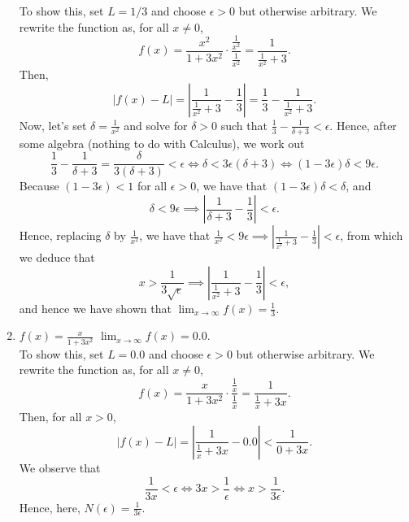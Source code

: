 \begin{enumerate}
    To show this, set $L=1/3$ and choose $\epsilon >0$ but otherwise arbitrary. We rewrite the function as, for all $x \neq 0$,
    $$f(x) = \frac{x^2}{1 + 3 x^2} \cdot \frac{\frac{1}{x^2}}{\frac{1}{x^2}} =  \frac{1}{\frac{1}{x^2} + 3 }.$$
     Then, 
   $$ |f(x) -L| = |\frac{1}{\frac{1}{x^2} + 3 } - \frac{1}{3}|  =  \frac{1}{3} - \frac{1}{\frac{1}{x^2} + 3 }.$$ 
   Now, let's set $\delta =  \frac{1}{x^2}$ and solve for $\delta>0$ such that $\frac{1}{3} - \frac{1}{\delta + 3 } < \epsilon.$ Hence, after some algebra (nothing to do with Calculus), we work out
   $$\frac{1}{3} - \frac{1}{\delta + 3 } = \frac{\delta}{3 (\delta + 3)} < \epsilon \iff \delta < 3 \epsilon (\delta + 3) \iff (1-3 \epsilon) \delta < 9 \epsilon .$$
   Because $(1-3 \epsilon) < 1$ for all $\epsilon>0$, we have that  $(1-3 \epsilon) \delta < \delta$, and 
   $$\delta < 9 \epsilon \implies   |\frac{1}{\delta + 3 } - \frac{1}{3}| < \epsilon. $$ 
   Hence, replacing $\delta$ by $\frac{1}{x^2}$, we have that  $\frac{1}{x^2} < 9 \epsilon  \implies |\frac{1}{\frac{1}{x^2} + 3 } - \frac{1}{3}|  < \epsilon$, from which we deduce that
   $$ x> \frac{1}{3 \sqrt{\epsilon}} \implies |\frac{1}{\frac{1}{x^2} + 3 } - \frac{1}{3}| < \epsilon,$$ 
   and hence we have shown that $\displaystyle\lim_{x \to \infty} f(x) =\frac{1}{3}$. 



     \item $f(x) = \frac{x}{1 + 3 x^2}$ \Ans $\displaystyle\lim_{x \to \infty} f(x) =0.0$.\\


     To show this, set $L=0.0$ and choose $\epsilon >0$ but otherwise arbitrary. We rewrite the function as, for all $x \neq 0$,
    $$f(x) = \frac{x}{1 + 3 x^2} \cdot \frac{\frac{1}{x}}{\frac{1}{x}} =  \frac{1}{\frac{1}{x} + 3x }.$$
    Then, for all $x>0$,
   $$ |f(x) -L| = | \frac{1}{\frac{1}{x} + 3x } - 0.0|  < \frac{1}{0 + 3x }.$$ 
   We observe that 
   $$\frac{1}{3x } < \epsilon \iff 3x > \frac{1}{\epsilon} \iff x > \frac{1}{3\epsilon}.$$ 
   Hence, here, $N(\epsilon) =\frac{1}{3\epsilon}.$\\


\end{enumerate}
